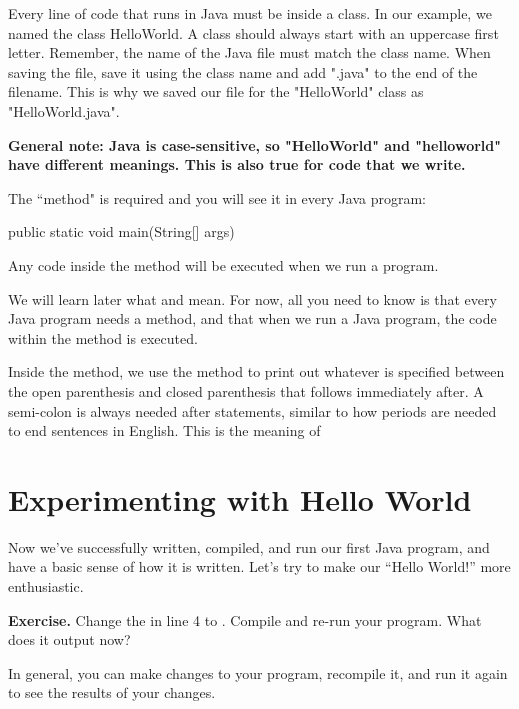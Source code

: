 Every line of code that runs in Java must be inside a class. In our example, we named the class HelloWorld. A class should always start with an uppercase first letter. Remember, the name of the Java file must match the class name. When saving the file, save it using the class name and add ".java" to the end of the filename. This is why we saved our file for the "HelloWorld" class as "HelloWorld.java". 

\textbf{General note: Java is case-sensitive, so "HelloWorld" and "helloworld" have different meanings. This is also true for code that we write.} 

The  ``method" is required and you will see it in every Java program: 

\begin{code}
public static void main(String[] args)
\end{code}

Any code inside the  method will be executed when we run a program. 

We will learn later what
 and  mean. For now, all you need to know is that every Java program needs a  method, and that when we run a Java program, the code within the  method is executed. 

Inside the  method, we use the  method to print out whatever is specified between the open parenthesis \ic{(} and closed parenthesis\ic{ )} that follows immediately after. A semi-colon is always needed after statements, similar to how periods are needed to end sentences in English. This is the meaning of 

\section{Experimenting with Hello World}
Now we've successfully written, compiled, and run our first Java program, and have a basic sense of how it is written. Let's try to make our ``Hello World!'' more enthusiastic.
\newline

\textbf{Exercise.} Change the  in line 4 to . Compile and re-run your program. What does it output now? 
\newline

 In general, you can make changes to your program, recompile it, and run it again to see the results of your changes.

